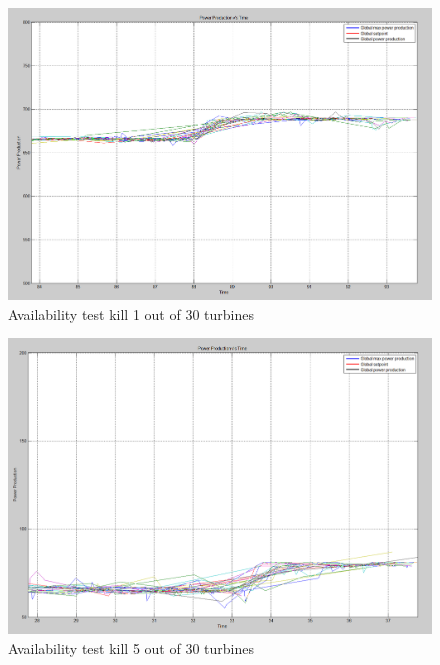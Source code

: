 \begin{figure} [!h]
	\centering
	\includegraphics[width=\resultsFigureWidthScale\textwidth]{figures/Results/availabilitytest30-29_setpoint_20000.PNG}
	\caption{Availability test kill 1 out of 30 turbines}
	\label{fig:exp:availability_kill1}
\end{figure}

\begin{figure} [!h]
	\centering
	\includegraphics[width=\resultsFigureWidthScale\textwidth]{figures/Results/availabilitytest30-25_setpoint_2000.PNG}
	\caption{Availability test kill 5 out of 30 turbines}
	\label{fig:exp:availability_kill5}
\end{figure}

